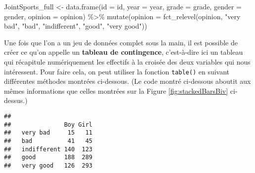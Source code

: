 \documentclass[
]{book}
\newenvironment{Shaded}{\begin{snugshade}}{\end{snugshade}}
\newcommand{\AttributeTok}[1]{\textcolor[rgb]{0.77,0.63,0.00}{#1}}
\newcommand{\CommentTok}[1]{\textcolor[rgb]{0.56,0.35,0.01}{\textit{#1}}}
\newcommand{\FunctionTok}[1]{\textcolor[rgb]{0.00,0.00,0.00}{#1}}
\newcommand{\NormalTok}[1]{#1}
\newcommand{\OtherTok}[1]{\textcolor[rgb]{0.56,0.35,0.01}{#1}}
\newcommand{\SpecialCharTok}[1]{\textcolor[rgb]{0.00,0.00,0.00}{#1}}
\newcommand{\StringTok}[1]{\textcolor[rgb]{0.31,0.60,0.02}{#1}}
\begin{document}
\begin{Shaded}
\begin{Highlighting}[]
\NormalTok{JointSports\_full }\OtherTok{\textless{}{-}} 
  \FunctionTok{data.frame}\NormalTok{(}\AttributeTok{id =}\NormalTok{ id, }
             \AttributeTok{year =}\NormalTok{ year, }
             \AttributeTok{grade =}\NormalTok{ grade, }
             \AttributeTok{gender =}\NormalTok{ gender, }
             \AttributeTok{opinion =}\NormalTok{ opinion) }\SpecialCharTok{\%\textgreater{}\%}
  \FunctionTok{mutate}\NormalTok{(}\AttributeTok{opinion =} \FunctionTok{fct\_relevel}\NormalTok{(opinion, }
                               \StringTok{"very bad"}\NormalTok{, }
                               \StringTok{"bad"}\NormalTok{, }
                               \StringTok{"indifferent"}\NormalTok{, }
                               \StringTok{"good"}\NormalTok{, }
                               \StringTok{"very good"}\NormalTok{))}
\end{Highlighting}
\end{Shaded}

Une fois que l'on a un jeu de données complet sous la main, il est possible de créer ce qu'on appelle un \textbf{tableau de contingence}, c'est-à-dire ici un tableau qui récapitule numériquement les effectifs à la croisée des deux variables qui nous intéressent. Pour faire cela, on peut utiliser la fonction \texttt{table()} en suivant différentes méthodes montrées ci-dessous. (Le code montré ci-dessous aboutit aux mêmes informations que celles montrées sur la Figure \ref{fig:stackedBarsBiv} ci-dessus.)

\begin{Shaded}
\end{Shaded}

\begin{verbatim}
##              
##               Boy Girl
##   very bad     15   11
##   bad          41   45
##   indifferent 140  123
##   good        188  289
##   very good   126  293
\end{verbatim}
\end{document}
